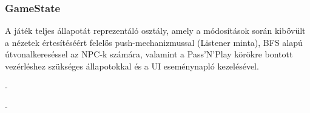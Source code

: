 \subsubsection{GameState}
\begin{class-template-responsibility}
    A játék teljes állapotát reprezentáló osztály, amely a módosítások során kibővült a nézetek értesítéséért felelős push-mechanizmussal (Listener minta), BFS alapú útvonalkereséssel az NPC-k számára, valamint a Pass'N'Play körökre bontott vezérléshez szükséges állapotokkal és a UI eseménynapló kezelésével.
\end{class-template-responsibility}
\begin{class-template-interface}
    -
\end{class-template-interface}
\begin{class-template-baseclass}
    -
\end{class-template-baseclass}
\begin{class-template-attribute}
\end{class-template-attribute}
